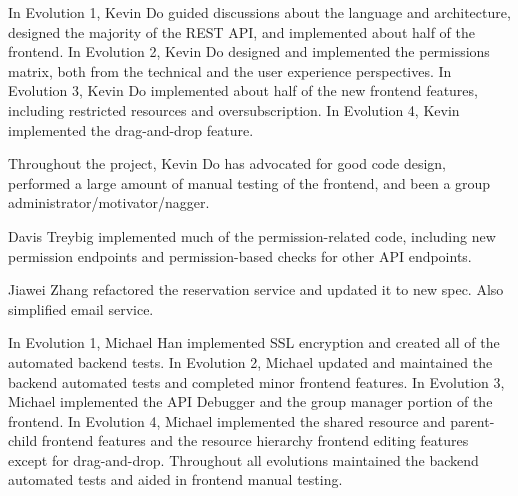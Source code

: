 \documentclass[12pt]{article}
\begin{document}
In Evolution 1, Kevin Do guided discussions about the language and architecture, designed the majority of the REST API, and implemented about half of the frontend. In Evolution 2, Kevin Do designed and implemented the permissions matrix, both from the technical and the user experience perspectives. In Evolution 3, Kevin Do implemented about half of the new frontend features, including restricted resources and oversubscription. In Evolution 4, Kevin implemented the drag-and-drop feature.

Throughout the project, Kevin Do has advocated for good code design, performed a large amount of manual testing of the frontend, and been a group administrator/motivator/nagger.

Davis Treybig implemented much of the permission-related code, including new permission endpoints and permission-based checks for other API endpoints. 

Jiawei Zhang refactored the reservation service and updated it to new spec. Also simplified email service.

In Evolution 1, Michael Han implemented SSL encryption and created all of the automated backend tests. In Evolution 2, Michael updated and maintained the backend automated tests and completed minor frontend features. In Evolution 3, Michael implemented the API Debugger and the group manager portion of the frontend. In Evolution 4, Michael implemented the shared resource and parent-child frontend features and the resource hierarchy frontend editing features except for drag-and-drop. Throughout all evolutions maintained the backend automated tests and aided in frontend manual testing.

\clearpage
\appendix
\end{document}

